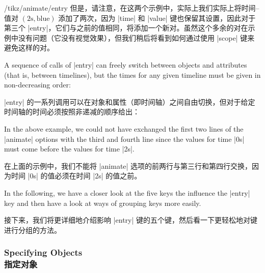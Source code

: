 \begin{key}{/tikz/animate/entry}
    但是，请注意，在这两个示例中，实际上我们实际上将时间--值对 $(2\mathrm{s}, \mathrm{blue})$ 添加了两次，因为 |time| 和 |value| 键也保留其设置，因此对于第三个 |entry|，它们与之前的值相同，将添加一个新对。虽然这个多余的对在示例中没有问题（它没有视觉效果），但我们稍后将看到如何通过使用 |scope| 键来避免这样的对。



    A sequence of calls of |entry| can freely switch between objects and
    attributes (that is, between timelines), but the times for any given
    timeline must be given in non-decreasing order:
    
    |entry| 的一系列调用可以在对象和属性（即时间轴）之间自由切换，但对于给定时间轴的时间必须按照非递减的顺序给出：


\begin{codeexample}[
    preamble={\usetikzlibrary{animations}},
    animation list={0.5,1,1.5,2},
]
\end{codeexample}
    In the above example, we could not have exchanged the first two lines of
    the |animate| options with the third and fourth line since the values for
    time |0s| must come before the values for time |2s|.

    在上面的示例中，我们不能将 |animate| 选项的前两行与第三行和第四行交换，因为时间 |0s| 的值必须在时间 |2s| 的值之前。


\end{key}

In the following, we have a closer look at the five keys the influence the
|entry| key and then have a look at ways of grouping keys more easily.

接下来，我们将更详细地介绍影响 |entry| 键的五个键，然后看一下更轻松地对键进行分组的方法。


\subsubsection{Specifying Objects\\指定对象}
\label{section-anim-def-obj}

